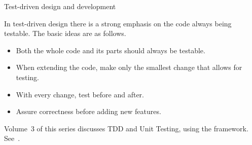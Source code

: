  {Test-driven design and development}

In test-driven design there is a strong emphasis on the code always
being testable. The basic ideas are as follows.
\begin{itemize}
\item Both the whole code and its parts should always be testable.
\item When extending the code, make only the smallest change that
  allows for testing.
\item With every change, test before and after.
\item Assure correctness before adding new features.
\end{itemize}

Volume~3 of this series discusses \ac{TDD} and Unit Testing, using the
 framework. See~.

